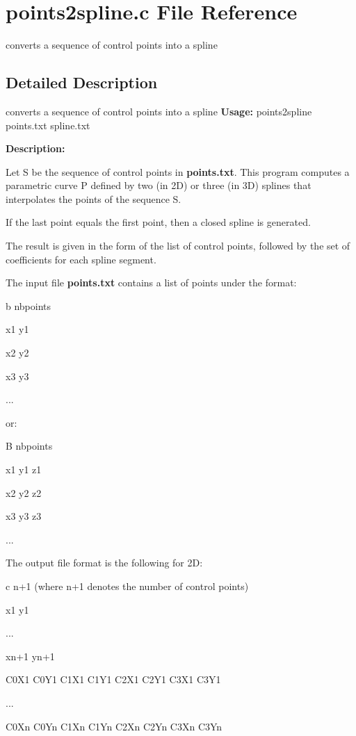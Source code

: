 \section{points2spline.c File Reference}
\label{points2spline_8c}


converts a sequence of control points into a spline  




\subsection{Detailed Description}
converts a sequence of control points into a spline {\bfseries Usage:} points2spline points.txt spline.txt

{\bfseries Description:}

Let S be the sequence of control points in {\bfseries points.txt}. This program computes a parametric curve P defined by two (in 2D) or three (in 3D) splines that interpolates the points of the sequence S.

If the last point equals the first point, then a closed spline is generated.

The result is given in the form of the list of control points, followed by the set of coefficients for each spline segment.

The input file {\bfseries points.txt} contains a list of points under the format:

b nbpoints\par
 x1 y1\par
 x2 y2\par
 x3 y3\par
 ...\par


or:

B nbpoints\par
 x1 y1 z1\par
 x2 y2 z2\par
 x3 y3 z3\par
 ...\par


The output file format is the following for 2D:

c n+1 (where n+1 denotes the number of control points)\par
 x1 y1\par
 ...\par
 xn+1 yn+1\par
 C0X1 C0Y1 C1X1 C1Y1 C2X1 C2Y1 C3X1 C3Y1\par
 ...\par
 C0Xn C0Yn C1Xn C1Yn C2Xn C2Yn C3Xn C3Yn\par


